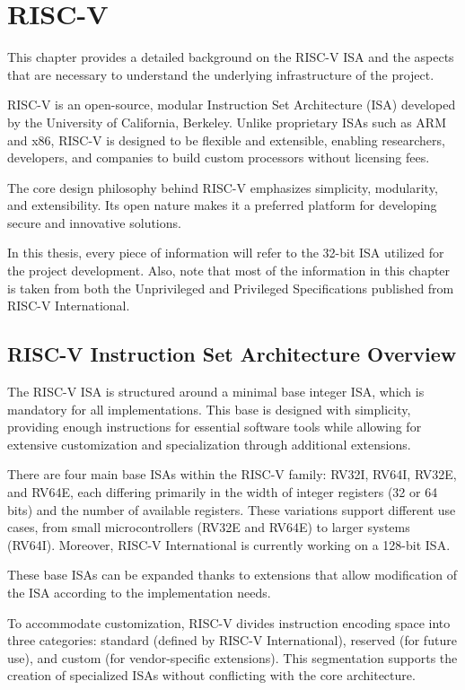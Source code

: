\chapter{RISC-V}
\label{cha:riscv}

This chapter provides a detailed background on the RISC-V ISA and the aspects
that are necessary to understand the underlying infrastructure of the project.

RISC-V is an open-source, modular Instruction Set Architecture (ISA) developed by
the University of California, Berkeley\cite{riscv}. Unlike proprietary ISAs such
as ARM and x86, RISC-V is designed to be flexible and extensible, enabling
researchers, developers, and companies to build custom processors without
licensing fees.

The core design philosophy behind RISC-V emphasizes simplicity, modularity, and
extensibility. Its open nature makes it a preferred platform for developing secure
and innovative solutions.

In this thesis, every piece of information will refer to the 32-bit ISA utilized
for the project development. Also, note that most of the information in this
chapter is taken from both the Unprivileged and Privileged Specifications\cite{specifications}
published from RISC-V International.

\section{RISC-V Instruction Set Architecture Overview}
\label{sec:riscv_isa}

The RISC-V ISA is structured around a minimal base integer ISA, which is mandatory
for all implementations. This base is designed with simplicity, providing enough
instructions for essential software tools while allowing for extensive customization
and specialization through additional extensions.

There are four main base ISAs within the RISC-V family: RV32I, RV64I, RV32E, and
RV64E, each differing primarily in the width of integer registers (32 or 64 bits)
and the number of available registers. These variations support different use cases,
from small microcontrollers (RV32E and RV64E) to larger systems (RV64I). Moreover,
RISC-V International is currently working on a 128-bit ISA.

These base ISAs can be expanded thanks to extensions that allow modification of
the ISA according to the implementation needs.

To accommodate customization, RISC-V divides instruction encoding space into three
categories: standard (defined by RISC-V International), reserved (for future use),
and custom (for vendor-specific extensions). This segmentation supports the creation
of specialized ISAs without conflicting with the core architecture.

